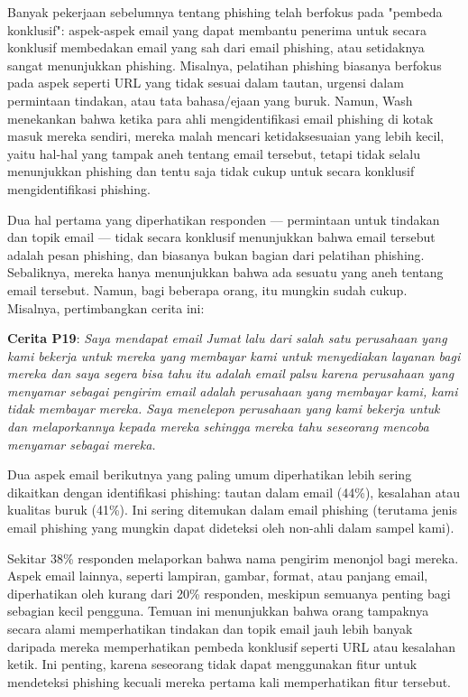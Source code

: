 \documentclass[lettersize,journal]{IEEEtran}
\begin{document}
Banyak pekerjaan sebelumnya tentang phishing telah berfokus pada "pembeda
konklusif": aspek-aspek email yang dapat membantu penerima untuk secara
konklusif membedakan email yang sah dari email phishing, atau setidaknya sangat
menunjukkan phishing. Misalnya, pelatihan phishing biasanya berfokus pada aspek
seperti URL yang tidak sesuai dalam tautan, urgensi dalam permintaan tindakan,
atau tata bahasa/ejaan yang buruk. Namun, Wash menekankan bahwa ketika para
ahli mengidentifikasi email phishing di kotak masuk mereka sendiri, mereka
malah mencari ketidaksesuaian yang lebih kecil, yaitu hal-hal yang tampak aneh
tentang email tersebut, tetapi tidak selalu menunjukkan phishing dan tentu saja
tidak cukup untuk secara konklusif mengidentifikasi phishing.

Dua hal pertama yang diperhatikan responden — permintaan untuk tindakan dan
topik email — tidak secara konklusif menunjukkan bahwa email tersebut adalah
pesan phishing, dan biasanya bukan bagian dari pelatihan phishing. Sebaliknya,
mereka hanya menunjukkan bahwa ada sesuatu yang aneh tentang email tersebut.
Namun, bagi beberapa orang, itu mungkin sudah cukup. Misalnya, pertimbangkan
cerita ini:

\textbf{Cerita P19}: \textit{Saya mendapat email Jumat lalu dari salah satu perusahaan yang kami bekerja untuk mereka yang membayar kami untuk menyediakan layanan bagi mereka dan saya segera bisa tahu itu adalah email palsu karena perusahaan yang menyamar sebagai pengirim email adalah perusahaan yang membayar kami, kami tidak membayar mereka. Saya menelepon perusahaan yang kami bekerja untuk dan melaporkannya kepada mereka sehingga mereka tahu seseorang mencoba menyamar sebagai mereka.}

Dua aspek email berikutnya yang paling umum diperhatikan lebih sering dikaitkan
dengan identifikasi phishing: tautan dalam email (44\%), kesalahan atau
kualitas buruk (41\%). Ini sering ditemukan dalam email phishing (terutama
jenis email phishing yang mungkin dapat dideteksi oleh non-ahli dalam sampel
kami).

Sekitar 38\% responden melaporkan bahwa nama pengirim menonjol bagi mereka.
Aspek email lainnya, seperti lampiran, gambar, format, atau panjang email,
diperhatikan oleh kurang dari 20\% responden, meskipun semuanya penting bagi
sebagian kecil pengguna. Temuan ini menunjukkan bahwa orang tampaknya secara
alami memperhatikan tindakan dan topik email jauh lebih banyak daripada mereka
memperhatikan pembeda konklusif seperti URL atau kesalahan ketik. Ini penting,
karena seseorang tidak dapat menggunakan fitur untuk mendeteksi phishing
kecuali mereka pertama kali memperhatikan fitur tersebut.
\end{document}
